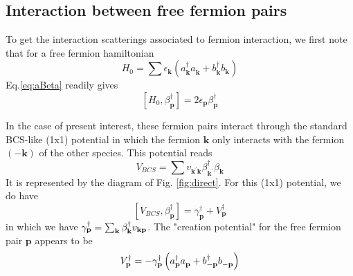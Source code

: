 \documentclass[aps,prb,superscriptaddress,twocolumn]{revtex4}
\newcommand{\vk}{\ensuremath{\mathbf{k}}}
\newcommand{\vp}{\ensuremath{\mathbf{p}}}
\begin{document}
\subsection{Interaction between free fermion pairs}

To get the interaction scatterings associated to fermion interaction, we
first note that for a free fermion hamiltonian 
\begin{equation}  \label{eq:h0}
H_0=\sum{\epsilon_\vk\left(a^{\dagger}_{\mathbf{k} } a^{}_{\mathbf{k}
}+b^{\dagger}_{\mathbf{k} } b^{}_{\mathbf{k} }\right) }
\end{equation}
Eq.\eqref{eq:aBeta} readily gives 
\begin{equation}  \label{eq:betaH}
\left[H_0,\beta^{\dagger}_\vp\right]  =2\epsilon_\vp\beta^{\dagger}_\vp
\end{equation}

In the case of present interest, these fermion pairs interact through the
standard BCS-like (1x1) potential in which the fermion $\mathbf{k} $ only
interacts with the fermion $\left(-\mathbf{k} \right) $ of the other
species. This potential reads 
\begin{equation}  \label{eq:vbcs}
V_{BCS}=\sum{v_{\mathbf{k} ^{\prime}\mathbf{k} }\beta^{\dagger}_{\mathbf{k}
^{\prime}}\beta^{}_{\mathbf{k} }}
\end{equation}
It is represented by the diagram of Fig. \ref{fig:direct}. For this (1x1)
potential, we do have 
\begin{equation}  \label{eq:vbeta}
\left[V_{BCS},\beta^{\dagger}_\vp\right] 
=\gamma^{\dagger}_\vp+V^{\dagger}_\vp
\end{equation}
in which we have $\gamma^{\dagger}_\vp=\sum_\vk\beta^{\dagger}_\vk{}v_{%
\mathbf{k} \mathbf{p} }$. The "creation potential" for the free fermion pair 
$\mathbf{p} $ appears to be 
\begin{equation}  \label{eq:betaV}
V^{\dagger}_\vp=-{\gamma^{\dagger}_\vp}\left(a^{\dagger}_{\mathbf{p} }a^{}_{%
\mathbf{p} }+b^{\dagger}_{-\mathbf{p} }b^{}_{-\mathbf{p} }\right) 
\end{equation}
\end{document}
